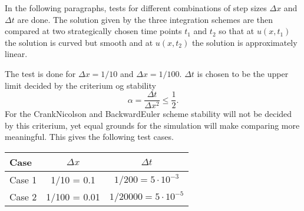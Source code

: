 In the following paragraphs, tests for different combinations of
step sizes $\Delta x$ and $\Delta t$ are done. The solution given
by the three integration schemes are then compared at two
strategically chosen time points $t_1$ and $t_2$ so that at $u(x,
t_1)$ the solution is curved but smooth and at $u(x, t_2)$ the
solution is approximately linear.

The test is done for $\Delta x = 1/10$ and $\Delta x = 1/100$.
$\Delta t$ is chosen to be the upper limit decided by the criterium
og stability \[ \alpha = \frac{\Delta t}{\Delta x^2} \leq
\frac{1}{2}. \] For the CrankNicolson and BackwardEuler scheme
stability will not be decided by this criterium, yet equal grounds
for the simulation will make comparing more meaningful. This gives
the following test cases.

\begin{center}
\begin{tabular}[htbp]{|l|c|c|}
    \hline
    Case & $\Delta x$ & $\Delta t$ \\
    \hline
    \hline
    Case 1 & 1/10 = 0.1 & $1/200 = 5 \cdot 10^{-3}$ \\
    \hline
    Case 2 & 1/100 = 0.01 & $1/20000 = 5 \cdot 10^{-5}$ \\
    \hline
\end{tabular}
\end{center}
